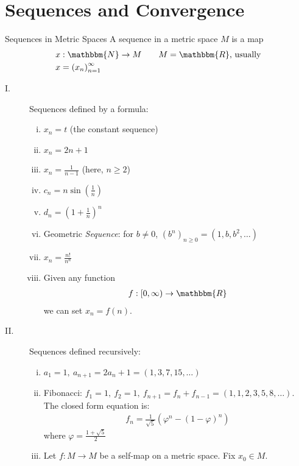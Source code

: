 \documentclass[10pt]{extarticle}
\newcommand{\N}{\mathbbm{N}}
\newcommand{\R}{\mathbbm{R}}
\begin{document}
  \section*{Sequences and Convergence}%
  \begin{problem}{Sequences in Metric Spaces}
    A sequence in a metric space $M$ is a map
    \begin{align*}
      x&: \N \rightarrow M \tag*{$M = \R$, usually}\\
      x &= \left(x_n\right)_{n=1}^{\infty}
    \end{align*}
    \begin{description}
      \item[I.] Sequences defined by a formula:
        \begin{enumerate}[(i)]
          \item $x_n = t$ (the constant sequence)
          \item $x_n = 2n + 1$
          \item $x_n = \frac{1}{n-1}$ (here, $n \geq 2$)
          \item $c_n = n\sin\left(\frac{1}{n}\right)$
          \item $d_n = \left(1 + \frac{1}{n}\right)^n$
          \item Geometric \textsl{Sequence}: for $b\neq 0$, $(b^n)_{n\geq 0} = (1,b,b^2,\dots)$
          \item $x_n = \frac{n!}{n^n}$
          \item Given any function
            \begin{align*}
              f:[0,\infty)\rightarrow\R
            \end{align*}
            we can set $x_n = f(n)$.
        \end{enumerate}
      \item[II.] Sequences defined recursively:
        \begin{enumerate}[(i)]
          \item $a_1 = 1,~a_{n+1}=2a_n + 1 = (1,3,7,15,\dots)$
          \item Fibonacci: $f_1 = 1,~f_2 = 1,~f_{n+1} = f_{n} + f_{n-1} = (1,1,2,3,5,8,\dots)$. The closed form equation is:
            \begin{align*}
              f_n = \frac{1}{\sqrt{5}}\left(\varphi^n - (1-\varphi)^n\right)
            \end{align*}
            where $\varphi = \frac{1 + \sqrt{5}}{2}$
          \item Let $f: M\rightarrow M$ be a self-map on a metric space. Fix $x_0\in M$.\\


\end{enumerate}
\end{description}
\end{problem}
\end{document}
